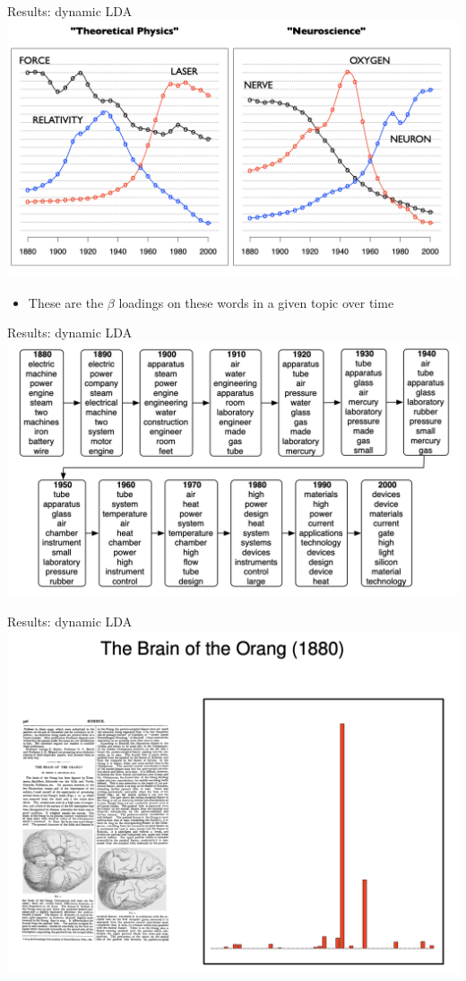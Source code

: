 \documentclass[english]{beamer}
\begin{document}
\begin{frame}{Results: dynamic LDA}
\centering
\includegraphics[width=1 \textwidth]{Images/dynamic_trends.png} 

\begin{itemize}
\setlength{\itemsep}{0.6em}
\item These are the $\beta$ loadings on these words in a given topic over time 
\end{itemize}
\end{frame}

\begin{frame}{Results: dynamic LDA}
\centering
\includegraphics[width=1 \textwidth]{Images/dynamic_results.png} 
\end{frame}

\begin{frame}{Results: dynamic LDA}
\centering
\includegraphics[width=0.9 \textwidth]{Images/brain_orang.png} 
\end{frame}
\end{document}
